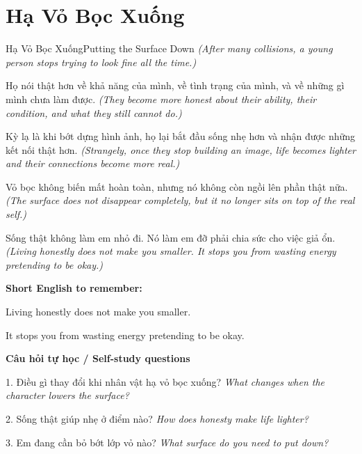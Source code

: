 \section{Hạ Vỏ Bọc Xuống}
\begin{truyen}{Hạ Vỏ Bọc Xuống}{Putting the Surface Down}
\textit{(After many collisions, a young person stops trying to look fine all the time.)}

Họ nói thật hơn về khả năng của mình, về tình trạng của mình, và về những gì mình chưa làm được.
\textit{(They become more honest about their ability, their condition, and what they still cannot do.)}

Kỳ lạ là khi bớt dựng hình ảnh, họ lại bắt đầu sống nhẹ hơn và nhận được những kết nối thật hơn.
\textit{(Strangely, once they stop building an image, life becomes lighter and their connections become more real.)}

Vỏ bọc không biến mất hoàn toàn, nhưng nó không còn ngồi lên phần thật nữa.
\textit{(The surface does not disappear completely, but it no longer sits on top of the real self.)}

\end{truyen}

\begin{baihoc}
Sống thật không làm em nhỏ đi. Nó làm em đỡ phải chia sức cho việc giả ổn.
\textit{(Living honestly does not make you smaller. It stops you from wasting energy pretending to be okay.)}
\end{baihoc}

\begin{ghinhoanh}
\textbf{Short English to remember:}

Living honestly does not make you smaller.

It stops you from wasting energy pretending to be okay.

\end{ghinhoanh}

\begin{tuhocnhanh}
\textbf{Câu hỏi tự học / Self-study questions}

1. Điều gì thay đổi khi nhân vật hạ vỏ bọc xuống? \textit{What changes when the character lowers the surface?}

2. Sống thật giúp nhẹ ở điểm nào? \textit{How does honesty make life lighter?}

3. Em đang cần bỏ bớt lớp vỏ nào? \textit{What surface do you need to put down?}
\end{tuhocnhanh}
